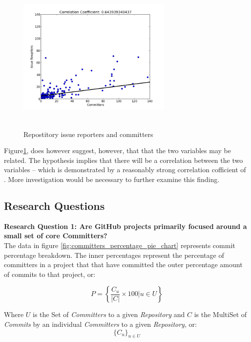 \documentclass{proc}
\begin{document}
{{{{{{{\begin{figure}
\includegraphics[height=3in,width=3in]{images/issue_reporters_committers_scatterplot.png}
\caption{Repostitory issue reporters and committers}
\label{fig:issue_reporters_committers_scatterplot}
\end{figure}

Figure\ref{fig:issue_reporters_committers_scatterplot}, does however suggest, however, that that the two variables may be related. The hypothesis implies that there will be a correlation between the two variables -- which is demonstrated by a reasonably strong correlation cofficient of . More investigation would be necessary to further examine this finding.\\

\subsection{Research Questions}
\textbf{Research Question 1: Are GitHub projects primarily focused around a small set of core Committers?}\\
The data in figure \ref{fig:committers_percentage_pie_chart} represents commit percentage breakdown. The inner percentages represent the percentage of committers in a project that that have committed the outer percentage amount of commits to that project, or:

\begin{equation}
P = \left\{ \frac{ C_u } { |C| } \times 100 \Big| u \in U \right\}
\label{eq:commit_percentage}
\end{equation}

Where $U$ is the Set of \textit{Committers} to a given \textit{Repository} and $C$ is the MultiSet of \textit{Commits} by an individual \textit{Committers} to a given \textit{Repository}, or:
 \[ \{ C_u \}_{u \in U} \]

}}}}}}}
\end{document}
